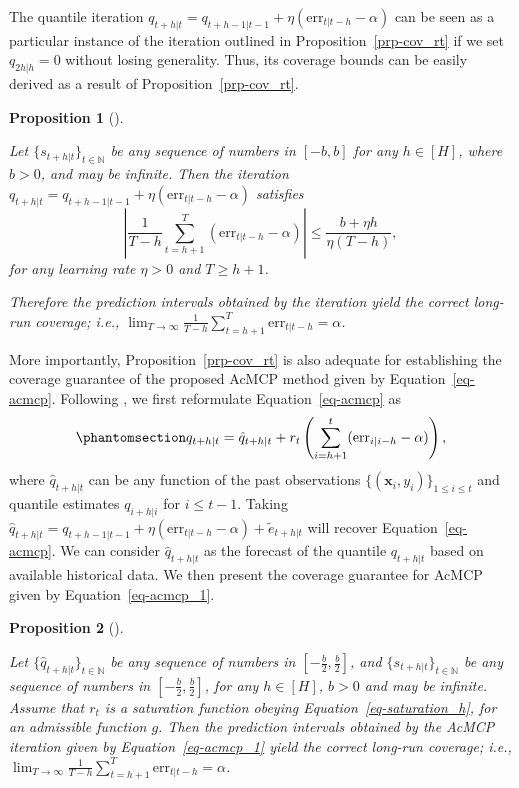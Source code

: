 \documentclass[
  11pt,
  a4paper,
]{article}
\theoremstyle{plain}
\newtheorem{proposition}{Proposition}[section]
\theoremstyle{remark}
\begin{document}
The quantile iteration
\(q_{t+h|t}=q_{t+h-1|t-1}+\eta (\mathrm{err}_{t|t-h}-\alpha)\) can be
seen as a particular instance of the iteration outlined in
Proposition~\ref{prp-cov_rt} if we set \(q_{2h|h}=0\) without losing
generality. Thus, its coverage bounds can be easily derived as a result
of Proposition~\ref{prp-cov_rt}.

\begin{proposition}[]\protect\hypertarget{prp-cov_qt}{}\label{prp-cov_qt}

Let \(\{s_{t+h|t}\}_{t\in\mathbb{N}}\) be any sequence of numbers in
\([-b, b]\) for any \(h\in[H]\), where \(b>0\), and may be infinite.
Then the iteration
\(q_{t+h|t}=q_{t+h-1|t-1}+\eta (\mathrm{err}_{t|t-h}-\alpha)\) satisfies
\[
\left|\frac{1}{T-h}\sum_{t=h+1}^{T}(\mathrm{err}_{t|t-h}-\alpha)\right| \leq \frac{b + \eta h}{\eta(T-h)},
\] for any learning rate \(\eta > 0\) and \(T \geq h+1\).

Therefore the prediction intervals obtained by the iteration yield the
correct long-run coverage; i.e.,
\(\lim _{T \rightarrow \infty} \frac{1}{T-h} \sum_{t=h+1}^T \mathrm{err}_{t|t-h} = \alpha\).

\end{proposition}

More importantly, Proposition~\ref{prp-cov_rt} is also adequate for
establishing the coverage guarantee of the proposed AcMCP method given
by Equation~\ref{eq-acmcp}. Following \textcite{angelopoulos2024}, we
first reformulate Equation~\ref{eq-acmcp} as
\begin{equation}\phantomsection\label{eq-acmcp_1}{
q_{t+h|t}=\hat{q}_{t+h|t}+r_t\left(\sum_{i=h+1}^t (\mathrm{err}_{i|i-h}-\alpha)\right),
}\end{equation} where \(\hat{q}_{t+h|t}\) can be any function of the
past observations \(\{(\bm{x}_i, y_i)\}_{1 \leq i \leq t}\) and quantile
estimates \(q_{i+h|i}\) for \(i \leq t-1\). Taking
\(\hat{q}_{t+h|t}=q_{t+h-1|t-1}+\eta (\mathrm{err}_{t|t-h}-\alpha)+\tilde{e}_{t+h|t}\)
will recover Equation~\ref{eq-acmcp}. We can consider
\(\hat{q}_{t+h|t}\) as the forecast of the quantile \(q_{t+h|t}\) based
on available historical data. We then present the coverage guarantee for
AcMCP given by Equation~\ref{eq-acmcp_1}.

\begin{proposition}[]\protect\hypertarget{prp-cov_acmcp}{}\label{prp-cov_acmcp}

Let \(\{\hat{q}_{t+h|t}\}_{t\in\mathbb{N}}\) be any sequence of numbers
in \([-\frac{b}{2}, \frac{b}{2}]\), and
\(\{s_{t+h|t}\}_{t\in\mathbb{N}}\) be any sequence of numbers in
\([-\frac{b}{2},\frac{b}{2}]\), for any \(h\in[H]\), \(b>0\) and may be
infinite. Assume that \(r_t\) is a saturation function obeying
Equation~\ref{eq-saturation_h}, for an admissible function \(g\). Then
the prediction intervals obtained by the AcMCP iteration given by
Equation~\ref{eq-acmcp_1} yield the correct long-run coverage; i.e.,
\(\lim _{T \rightarrow \infty} \frac{1}{T-h} \sum_{t=h+1}^T \mathrm{err}_{t|t-h} = \alpha\).

\end{proposition}
\end{document}
